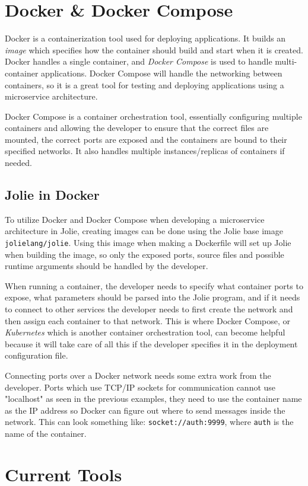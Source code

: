 \section{Docker \& Docker Compose}
Docker is a containerization tool used for deploying applications. It builds an \textit{image} which specifies how the container should build and start when it is created.
Docker handles a single container, and \textit{Docker Compose} is used to handle multi-container applications. Docker Compose will handle the networking between containers, so it is a great tool for testing and deploying applications using a microservice architecture.

Docker Compose is a container orchestration tool, essentially configuring multiple containers and allowing the developer to ensure that the correct files are mounted, the correct ports are exposed and the containers are bound to their specified networks. It also handles multiple instances/replicas 
of containers if needed.

\subsection{Jolie in Docker}
To utilize Docker and Docker Compose when developing a microservice architecture in Jolie, creating images can be done using the Jolie base image \texttt{jolielang/jolie}.
Using this image when making a Dockerfile will set up Jolie when building the image, so only the exposed ports, source files and possible runtime arguments should be handled by the developer.

When running a container, the developer needs to specify what container ports to expose, what parameters should be parsed into the Jolie program, and if it needs to connect to other services the developer needs to first create the network and then assign each container to that network.
This is where Docker Compose, or \textit{Kubernetes} which is another container orchestration tool, can become helpful because it will take care of all this if the developer specifies it in the deployment configuration file.

Connecting ports over a Docker network needs some extra work from the developer. Ports which use TCP/IP sockets for communication cannot use "localhost" as seen in the previous examples, they need to use the container name as the IP address so Docker can figure out where to send messages inside the network.
This can look something like: \texttt{socket://auth:9999}, where \texttt{auth} is the name of the container.

\section{Current Tools}
